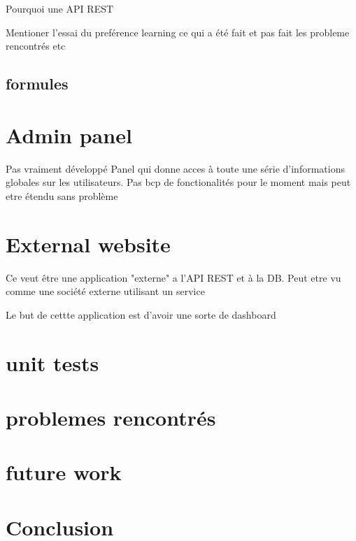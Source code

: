  Pourquoi une API REST
 
 Mentioner l'essai du preférence learning ce qui a été fait et pas fait les probleme rencontrés etc
 \subsection{formules}

\section{Admin panel}
Pas vraiment développé
Panel qui donne acces à toute une série d'informations globales sur les utilisateurs. Pas bcp de fonctionalités pour le moment mais peut etre étendu sans problème

\section{External website}
Ce veut être une application "externe" a l'API REST et à la DB. Peut etre vu comme une société externe utilisant un service

Le but de cettte application est d'avoir une sorte de dashboard

\section{unit tests}

\section{problemes rencontrés}
\section{future work}
\section{Conclusion}
